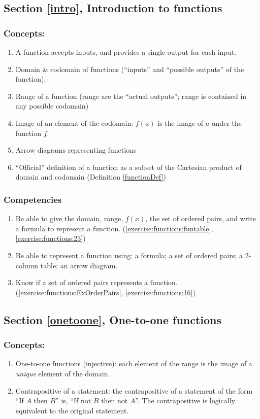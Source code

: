 \subsection*{Section \ref{intro}, Introduction to functions}
\subsubsection*{Concepts:}
\begin{enumerate}
\item A function accepts inputs, and provides a single output for each input.
\item 
Domain \& codomain of functions (``inputs'' and ``possible outputs'' of the function). 
\item
Range of a function (range are the ``actual outputs''; range is contained in any possible codomain)
\item
Image of an element of the codomain:  $f(a)$ is the image of $a$ under the function $f$.
\item
Arrow diagrams representing functions
\item
``Official'' definition of a function as a subset of the Cartesian product of domain and codomain (Definition \ref{functionDef})
\end{enumerate}

\subsubsection*{Competencies}
\begin{enumerate}
\item
Be able to give the domain, range, $f(x)$, the set of ordered pairs, and write a formula to represent a function. (\ref{exercise:functions:funtable}, \ref{exercise:functions:23})
\item
Be able to represent a function using: a formula; a set of ordered pairs; a 2-column table; an arrow diagram.
\item
Know if a set of ordered pairs represents a function.  (\ref{exercise:functions:ExOrderPairs}, \ref{exercise:functions:16})
\end{enumerate}


\subsection*{Section \ref{onetoone}, One-to-one functions}
\subsubsection*{Concepts:}
\begin{enumerate}
\item 
One-to-one functions (injective): each element of the range is the image of a \emph{unique} element of the domain.
\item
Contrapositive of a statement: the contrapositive of a statement of the form ``If $A$ then $B$'' is, ``If not $B$ then not $A$''.  The contrapositive is logically equivalent to the original statement.
\end{enumerate}

